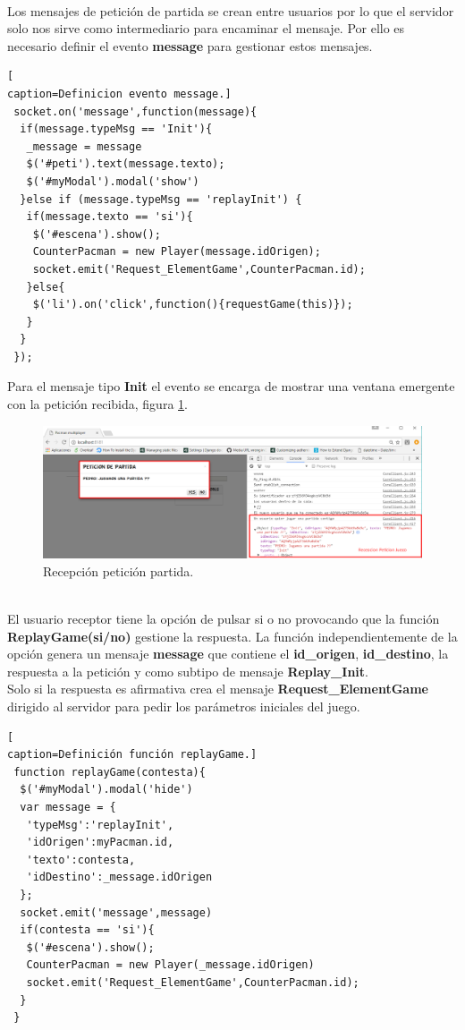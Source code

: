 \\Los mensajes de petición de partida se crean entre usuarios por lo que el servidor solo nos sirve como intermediario para encaminar el mensaje. Por ello es necesario definir el evento \textbf{message} para gestionar estos mensajes.
\begin{lstlisting}[
caption=Definicion evento message.]
 socket.on('message',function(message){
  if(message.typeMsg == 'Init'){
   _message = message
   $('#peti').text(message.texto);
   $('#myModal').modal('show')
  }else if (message.typeMsg == 'replayInit') {
   if(message.texto == 'si'){
    $('#escena').show();
    CounterPacman = new Player(message.idOrigen);
    socket.emit('Request_ElementGame',CounterPacman.id);
   }else{
    $('li').on('click',function(){requestGame(this)});
   }
  }	
 });
\end{lstlisting}
Para el mensaje tipo \textbf{Init} el evento se encarga de mostrar una ventana emergente con la petición recibida, figura \ref{fig:Client1_Resep_Peti_Game}.
\begin{figure}[!h]
\begin{center}
   \includegraphics[width=0.8\linewidth]{Figures/Client1_Resep_Peti_Game}
	\decoRule
	\caption[Recepción petición partida.]{Recepción petición partida.}
\label{fig:Client1_Resep_Peti_Game}
\end{center}
\end{figure}
\\El usuario receptor tiene la opción de pulsar si o no provocando que la función \textbf{ReplayGame(si/no)} gestione la respuesta. La función independientemente de la opción genera un mensaje \textbf{message} que contiene el \textbf{id\_origen}, \textbf{id\_destino}, la respuesta a la petición y como subtipo de mensaje \textbf{Replay\_Init}.
\\Solo si la respuesta es afirmativa crea el mensaje \textbf{Request\_ElementGame} dirigido al servidor para pedir los parámetros iniciales del juego.
\begin{lstlisting}[
caption=Definición función replayGame.]
 function replayGame(contesta){
  $('#myModal').modal('hide')
  var message = {
   'typeMsg':'replayInit',
   'idOrigen':myPacman.id,
   'texto':contesta,
   'idDestino':_message.idOrigen
  };
  socket.emit('message',message)
  if(contesta == 'si'){
   $('#escena').show();
   CounterPacman = new Player(_message.idOrigen)
   socket.emit('Request_ElementGame',CounterPacman.id);
  }
 }
\end{lstlisting}

